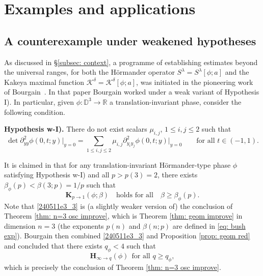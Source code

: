 \documentclass[reqno]{amsart}
\numberwithin{equation}{section}
\newcommand{\D}{\mathbb{D}}
\newcommand{\R}{\mathbb{R}}
\newcommand{\bH}{\mathbf{H}}
\newcommand{\bK}{\mathbf{K}}
\theoremstyle{plain}
\theoremstyle{definition}
\begin{document}



\section{Examples and applications}







\subsection{A counterexample under weakened hypotheses}\label{subsec: counterexample} As discussed in \S\ref{subsec: context}, a programme of establishing estimates beyond the universal ranges, for both the H\"ormander operator $S^{\lambda}=S^{\lambda}[\phi; a]$ and the Kakeya maximal function $\mathcal{K}^{\delta}= \mathcal{K}^{\delta}[\phi; a]$, was initiated in the pioneering work of Bourgain~\cite{Bourgain1991}. In that paper Bourgain worked under a weak variant of Hypothesis I). In particular, given $\phi \colon \D^3 \to \R$ a translation-invariant phase, consider the following condition.\medskip

\noindent \textbf{Hypothesis w-I).} There do not exist scalars $\mu_{i,j}$, $1 \leq i, j \leq 2$ such that
   \begin{equation*}
    \det \partial_{yy}^2\phi(0,t;y)\big|_{y = 0} = \sum_{1 \leq i, j \leq 2} \mu_{i,j} \partial_{y_iy_j}^2 \phi(0,t;y)\big|_{y = 0} \qquad \textrm{for all $t \in (-1,1)$.}
\end{equation*} 

It is claimed in \cite[\S6]{Bourgain1991} that for any translation-invariant H\"ormander-type phase $\phi$ satisfying Hypothesis w-I) and all $p> p(3)=2$, there exists $\beta_{\phi}(p)< \beta(3; p)=1/p$ such that 
\begin{equation}\label{240511e3_3}
    \bK_{p\to 1}(\phi; \beta) \quad \textrm{holds for all} \quad \beta \geq \beta_{\phi}(p).
\end{equation}
Note that \eqref{240511e3_3} is (a slightly weaker version of) the conclusion of Theorem \ref{thm: n=3 osc improve}, which is Theorem \ref{thm: geom improve} in dimension $n=3$ (the exponents $p(n)$ and $\beta(n; p)$ are defined in \eqref{eq: bush exp}). Bourgain then combined \eqref{240511e3_3} and Proposition \ref{prop: geom red} and concluded that 
there exists $q_{\phi}<4$ such that 
\begin{equation*}
    \bH_{\infty \to q}(\phi) \ \ \text{for all } q\ge q_{\phi},
\end{equation*}
which is precisely the conclusion of Theorem \ref{thm: n=3 osc improve}.
\end{document}
